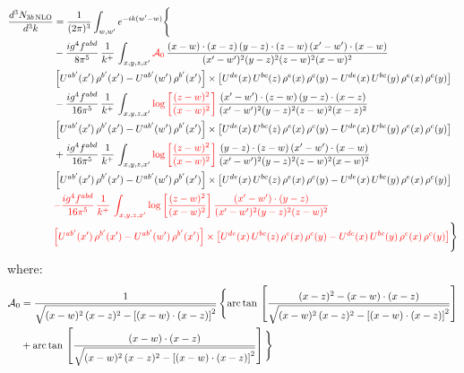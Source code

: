 \documentclass[9pt]{article}
\numberwithin{equation}{section}
\begin{document}
\begin{align}
\frac{d^{3}N_{3b\,\rm NLO}}{d^{3}k} & = \frac{1}{(2\pi)^{3}}\int_{w,w'}e^{-ik(w'-w)}\Bigg\{\notag \\
&-\frac{ig^{4}f^{abd}}{8\pi^{5}}\,\frac{1}{k^{+}}\,\int_{x,y,z,x'}{\color{red}\mathcal{A}_{0}}\,
\frac{(x-w)\cdot(x-z)\,(y-z)\cdot(z-w)\,(x'-w')\cdot(x-w)}{(x'-w')^{2}(y-z)^{2}(z-w)^{2}(x-w)^{2}}\notag \\ & \left[U^{ab'}(x')\,\rho^{b'}(x')-U^{ab'}(w')\, \rho^{b'}(x')\right]\times \left[U^{de}(x)\,U^{bc}(z)\, \rho^{e}(x)\,\rho^{c}(y)-U^{de}(x)\,U^{bc}(y)\,\rho^{e}(x)\,\rho^{c}(y)\right] \notag \\
& -\frac{ig^{4}f^{abd}}{16\pi^{5}}\,\frac{1}{k^{+}}\,\int_{x,y,z,x'}{\color{red}\log{\left[\frac{(z-w)^{2}}{(x-w)^{2}}\right]}}\,
\frac{(x'-w')\cdot(z-w)\,(y-z)\cdot(x-z)}{(x'-w')^{2}(y-z)^{2}(z-w)^{2}(x-z)^{2}}\notag \\
&\left[U^{ab'}(x')\,\rho^{b'}(x')-U^{ab'}(w')\, \rho^{b'}(x')\right]\times \left[U^{de}(x)\,U^{bc}(z)\, \rho^{e}(x)\,\rho^{c}(y)-U^{de}(x)\,U^{bc}(y)\,\rho^{e}(x)\,\rho^{c}(y)\right] \notag \\
&+ \frac{ig^{4}f^{abd}}{16\pi^{5}}\,\frac{1}{k^{+}}\,\int_{x,y,z,x'}{\color{red}\log{\left[\frac{(z-w)^{2}}{(x-w)^{2}}\right]}}\,
\frac{(y-z)\cdot(z-w)\,(x'-w')\cdot(x-w)}{(x'-w')^{2}(y-z)^{2}(z-w)^{2}(x-w)^{2}}\notag \\ 
& \left[U^{ab'}(x')\,\rho^{b'}(x')-U^{ab'}(w')\, \rho^{b'}(x')\right]\times \left[U^{de}(x)\,U^{bc}(z)\, \rho^{e}(x)\,\rho^{c}(y)-U^{de}(x)\,U^{bc}(y)\,\rho^{e}(x)\,\rho^{c}(y)\right]\notag \\ & {\color{red}-\frac{ig^{4}f^{abd}}{16\pi^{5}}\,\frac{1}{k^{+}}\,\int_{x,y,z,x'}\log{\left[\frac{(z-w)^{2}}{(x-w)^{2}}\right]}\,\frac{(x'-w')\cdot(y-z)}{(x'-w')^{2}(y-z)^{2}(z-w)^{2}}}\notag \\ & {\color{red}\left[U^{ab'}(x')\,\rho^{b'}(x')-U^{ab'}(w')\, \rho^{b'}(x')\right]\times \left[U^{de}(x)\,U^{bc}(z)\, \rho^{e}(x)\,\rho^{c}(y)-U^{de}(x)\,U^{bc}(y)\,\rho^{e}(x)\,\rho^{c}(y)\right]}\Bigg\}
\end{align}
where: \begin{align}
\mathcal{A}_{0} & = \frac{1}{\sqrt{(x-w)^{2}\,(x-z)^{2}-\left[(x-w)\cdot (x-z)\right]^{2}}}\, \Bigg\{\mathrm{arc\,tan}\,\left[\frac{(x-z)^{2}-(x-w)\cdot (x-z)}{\sqrt{(x-w)^{2}\,(x-z)^{2}-\left[(x-w)\cdot (x-z)\right]^{2}}}\right]\notag \\ & + \mathrm{arc\,tan}\,\left[\frac{(x-w)\cdot (x-z)}{\sqrt{(x-w)^{2}\,(x-z)^{2}-\left[(x-w)\cdot (x-z)\right]^{2}}}\right] \Bigg\}
\end{align}
\end{document}

